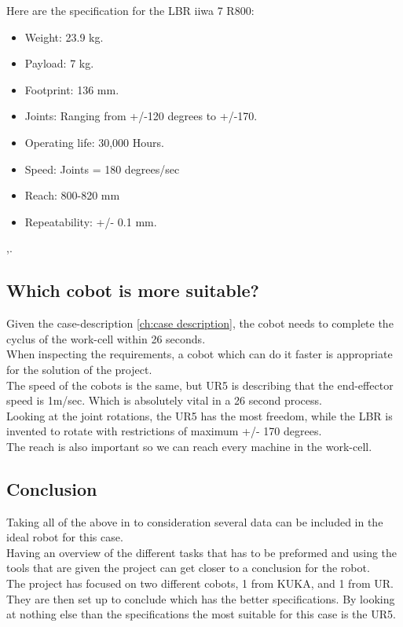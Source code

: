 Here are the specification for the LBR iiwa 7 R800:\\

\begin{itemize}
    \item Weight: 23.9 kg.
    \item Payload: 7 kg.
    \item Footprint: 136 mm.
    \item Joints: Ranging from +/-120 degrees to +/-170.
    \item Operating life: 30,000 Hours.
    \item Speed: Joints = 180 degrees/sec
    \item Reach: 800-820 mm
    \item Repeatability: +/- 0.1 mm.
\end{itemize}
\cite{KukaSpec1},\cite{KukaSpec2}.

\subsection{Which cobot is more suitable?}

Given the case-description \ref{ch:case description}, the cobot needs to complete the cyclus of the work-cell within 26 seconds.\\
When inspecting the requirements, a cobot which can do it faster is appropriate for the solution of the project.\\
The speed of the cobots is the same, but UR5 is describing that the end-effector speed is 1m/sec. Which is absolutely vital in a 26 second process.\\
Looking at the joint rotations, the UR5 has the most freedom, while the LBR is invented to rotate with restrictions of maximum +/- 170 degrees.\\
The reach is also important so we can reach every machine in the work-cell.\\

\subsection{Conclusion}

Taking all of the above in to consideration several data can be included in the ideal robot for this case.\\
Having an overview of the different tasks that has to be preformed and using the tools that are given the project can get closer to a conclusion for the robot.\\
The project has focused on two different cobots, 1 from KUKA, and 1 from UR. They are then set up to conclude which has the better specifications. By looking at nothing else than the specifications the most suitable for this case is the UR5.\\

\newpage

